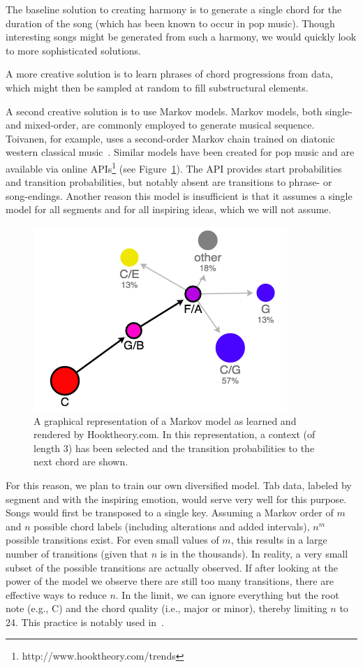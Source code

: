 \documentclass[11pt,phd]{byuprop}
\begin{document}
The baseline solution to creating harmony is to generate a single chord for the duration of the song (which has been known to occur in pop music). Though interesting songs might be generated from such a harmony, we would quickly look to more sophisticated solutions.

A more creative solution is to learn phrases of chord progressions from data, which might then be sampled at random to fill substructural elements.

A second creative solution is to use Markov models. Markov models, both single- and mixed-order, are commonly employed to generate musical sequence. Toivanen, for example, uses a second-order Markov chain trained on diatonic western classical music~\cite{toivanen2013automatical}. Similar models have been created for pop music and are available via online APIs\footnote{http://www.hooktheory.com/trends} (see Figure~\ref{fig:hook_theory}). The API provides start probabilities and transition probabilities, but notably absent are transitions to phrase- or song-endings. Another reason this model is insufficient is that it assumes a single model for all segments and for all inspiring ideas, which we will not assume.

\begin{figure}
  \centering
  \includegraphics[width=.35\textwidth]{graphics/hook_theory_example.png}
  \caption{A graphical representation of a Markov model as learned and rendered by Hooktheory.com. In this representation, a context (of length 3) has been selected and the transition probabilities to the next chord are shown.}
    \label{fig:hook_theory}
\end{figure}

For this reason, we plan to train our own diversified model. Tab data, labeled by segment and with the inspiring emotion, would serve very well for this purpose. Songs would first be transposed to a single key. Assuming a Markov order of $m$ and $n$ possible chord labels (including alterations and added intervals), $n^m$ possible transitions exist. For even small values of $m$, this results in a large number of transitions (given that $n$ is in the thousands). In reality, a very small subset of the possible transitions are actually observed. If after looking at the power of the model we observe there are still too many transitions, there are effective ways to reduce $n$. In the limit, we can ignore everything but the root note (e.g., C) and the chord quality (i.e., major or minor), thereby limiting $n$ to 24. This practice is notably used in~\cite{steedman1984generative}.
\end{document}
